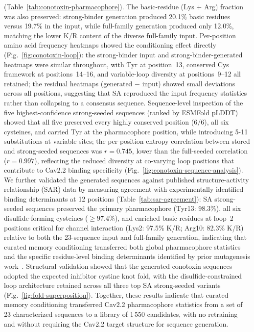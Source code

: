 (Table~\ref{tab:conotoxin-pharmacophore}). The basic-residue (Lys + Arg) fraction was also
preserved: strong-binder generation produced 20.1\% basic residues versus 19.7\% in
the input, while full-family generation produced only 12.0\%, matching the lower K/R content of
the diverse full-family input. Per-position amino acid frequency heatmaps showed
the conditioning effect directly (Fig.~\ref{fig:conotoxin-loop}): the strong-binder input and strong-binder-generated heatmaps were
similar throughout, with Tyr at position~13, conserved Cys framework at
positions~14--16, and variable-loop diversity at positions~9--12 all retained; the residual heatmaps
(generated $-$ input) showed small deviations across all positions, suggesting that SA
reproduced the input frequency statistics rather than collapsing to a consensus
sequence. Sequence-level inspection of the five
highest-confidence strong-seeded sequences (ranked by ESMFold pLDDT) showed that all five
preserved every highly conserved position ($6/6$), all six cysteines, and carried Tyr at the
pharmacophore position, while introducing 5-11 substitutions at variable sites; the
per-position entropy correlation between stored and strong-seeded sequences was $r = 0.745$,
lower than the full-seeded correlation ($r = 0.997$), reflecting the reduced
diversity at co-varying loop positions that contribute to Cav2.2 binding specificity
(Fig.~\ref{fig:conotoxin-sequence-analysis}). We further validated the generated sequences
against published structure-activity relationship (SAR) data by measuring agreement with
experimentally identified binding determinants at 12 positions
(Table~\ref{tab:sar-agreement}): SA strong-seeded sequences preserved the primary
pharmacophore (Tyr13: 98.3\%), all six disulfide-forming cysteines
($\geq 97.4\%$), and enriched basic residues at loop~2 positions critical for channel
interaction (Lys2: 97.5\% K/R; Arg10: 82.3\% K/R) relative to both the 23-sequence input
and full-family generation, indicating that curated memory conditioning
transferred both global pharmacophore statistics and the specific residue-level
binding determinants identified by prior mutagenesis
work~\cite{kimTyr13Essential1995,satoBasicResidues1993,lewisConotoxinSAR2012}.
Structural validation showed that the generated conotoxin sequences adopted the
expected inhibitor cystine knot fold, with the disulfide-constrained loop
architecture retained across all three top SA strong-seeded variants
(Fig.~\ref{fig:fold-superposition}). Together,
these results indicate that curated memory conditioning transferred Cav2.2 pharmacophore
statistics from a set of 23 characterized sequences to a library of 1\,550
candidates, with no retraining and without requiring the Cav2.2 target
structure for sequence generation.

